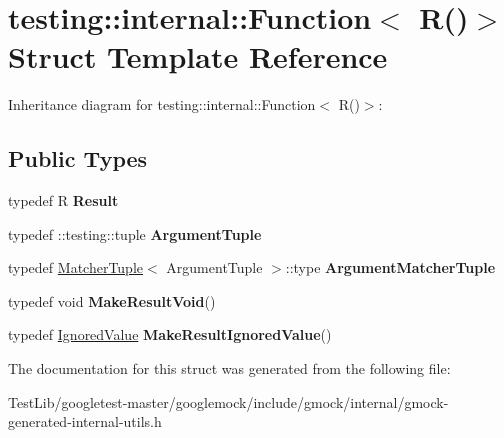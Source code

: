 \hypertarget{structtesting_1_1internal_1_1Function_3_01R_07_08_4}{}\section{testing\+:\+:internal\+:\+:Function$<$ R()$>$ Struct Template Reference}
\label{structtesting_1_1internal_1_1Function_3_01R_07_08_4}


Inheritance diagram for testing\+:\+:internal\+:\+:Function$<$ R()$>$\+:
\subsection*{Public Types}
\begin{DoxyCompactItemize}
\item 
\mbox{\label{structtesting_1_1internal_1_1Function_3_01R_07_08_4_a5c228a886ef598ac10988f8de5e32ca1}} 
typedef R {\bfseries Result}
\item 
\mbox{\label{structtesting_1_1internal_1_1Function_3_01R_07_08_4_ad483c3128c470d8cdb55c3ac1c575c11}} 
typedef \+::testing\+::tuple {\bfseries Argument\+Tuple}
\item 
\mbox{\label{structtesting_1_1internal_1_1Function_3_01R_07_08_4_a9bec5cf8937e8af99dedab2f40129fab}} 
typedef \hyperlink{structtesting_1_1internal_1_1MatcherTuple}{Matcher\+Tuple}$<$ Argument\+Tuple $>$\+::type {\bfseries Argument\+Matcher\+Tuple}
\item 
\mbox{\label{structtesting_1_1internal_1_1Function_3_01R_07_08_4_a666b5ad3bf155529d3a0f9fe6d5c897b}} 
typedef void {\bfseries Make\+Result\+Void}()
\item 
\mbox{\label{structtesting_1_1internal_1_1Function_3_01R_07_08_4_aa459093a5b52ef54e2544b5a6c054383}} 
typedef \hyperlink{classtesting_1_1internal_1_1IgnoredValue}{Ignored\+Value} {\bfseries Make\+Result\+Ignored\+Value}()
\end{DoxyCompactItemize}


The documentation for this struct was generated from the following file\+:\begin{DoxyCompactItemize}
\item 
Test\+Lib/googletest-\/master/googlemock/include/gmock/internal/gmock-\/generated-\/internal-\/utils.\+h\end{DoxyCompactItemize}
